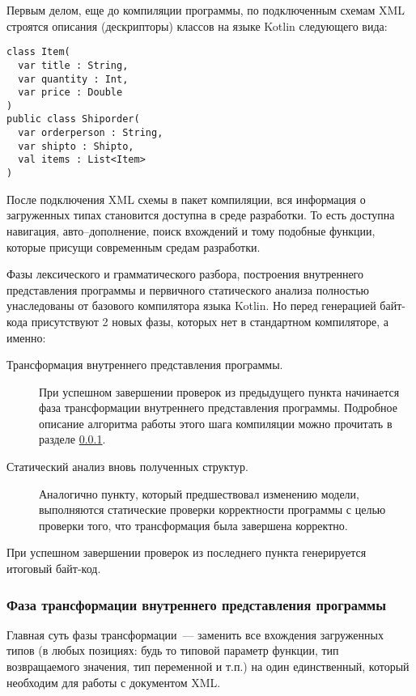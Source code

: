 Первым делом, еще до компиляции программы, по подключенным схемам XML строятся описания (дескрипторы) классов на языке Kotlin следующего вида:

\begin{lstlisting}
class Item(
  var title : String,
  var quantity : Int,
  var price : Double
)
public class Shiporder(
  var orderperson : String,
  var shipto : Shipto,
  val items : List<Item>
)
\end{lstlisting}

После подключения XML схемы в пакет компиляции, вся информация о загруженных типах становится доступна в среде разработки. То есть доступна навигация, авто--дополнение, поиск вхождений и тому подобные функции, которые присущи современным средам разработки.

Фазы лексического и грамматического разбора, построения внутреннего представления программы и первичного статического анализа полностью унаследованы от базового компилятора языка Kotlin. Но перед генерацией байт-кода присутствуют 2 новых фазы, которых нет в стандартном компиляторе, а именно:

\begin{description}
\item[Трансформация внутреннего представления программы.] При успешном завершении проверок из предыдущего пункта начинается фаза трансформации внутреннего представления программы. Подробное описание алгоритма работы этого шага компиляции можно прочитать в разделе \ref{xml-tranformation-phase}.
\item[Статический анализ вновь полученных структур.]
Аналогично пункту, который предшествовал изменению модели, выполняются статические проверки корректности программы с целью проверки того, что трансформация была завершена корректно.
\end{description}

При успешном завершении проверок из последнего пункта генерируется итоговый байт-код.
  
\subsubsection{Фаза трансформации внутреннего представления программы}\label{xml-tranformation-phase}
Главная суть фазы трансформации~--- заменить все вхождения загруженных типов (в любых позициях: будь то типовой параметр функции, тип возвращаемого значения, тип переменной и т.п.) на один единственный, который необходим для работы с документом XML.

